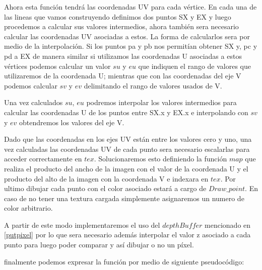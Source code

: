 \documentclass[a4paper]{article}
\newcounter{col}
\begin{document}
Ahora esta función tendrá las coordenadas UV para cada vértice. En cada una de las lineas que vamos construyendo definimos dos puntos SX y EX y luego procedemos a calcular sus valores intermedios, ahora también sera necesario calcular las coordenadas UV asociadas a estos. La forma de calcularlos sera por medio de la interpolación. Si los puntos pa y pb nos permitían obtener SX y, pc y pd a EX de manera similar si utilizamos las coordenadas U asociadas a estos vértices podemos calcular un valor $su$ y $eu$ que indiquen el rango de valores que utilizaremos de la coordenada U; mientras que con las coordenadas del eje V podemos calcular $sv$ y $ev$ delimitando el rango de valores usados de V.
\par Una vez calculados $su$, $eu$ podremos interpolar los valores intermedios para calcular las coordenadas U de los puntos entre SX.x y EX.x e interpolando con $sv$ y $ev$ obtendremos los valores del eje V.
\par Dado que las coordenadas en los ejes UV están entre los valores cero y uno, una vez calculadas las coordenadas UV de cada punto sera necesario escalarlas para acceder correctamente en $tex$. Solucionaremos esto definiendo la función $map$ que realiza el producto del ancho de la imagen con el valor de la coordenada U y el producto del alto de la imagen con la coordenada V e indexara en $tex$.
Por ultimo dibujar cada punto con el color asociado estará a cargo de $Draw\_point$. En caso de no tener una textura cargada simplemente asignaremos un numero de color arbitrario.  

A partir de este modo implementaremos el uso del $depthBuffer$ mencionado en \ref{putpixel} por lo que sera necesario además interpolar el valor z asociado a cada punto para luego poder comparar y así dibujar o no un píxel.

 
\par finalmente podemos expresar la función por medio de siguiente pseudocódigo: 
\end{document}
